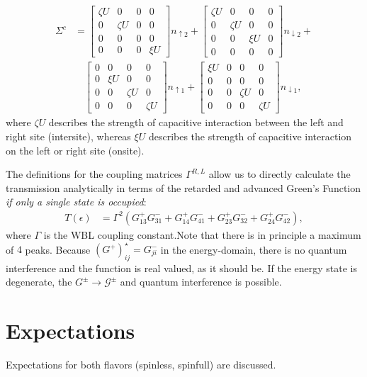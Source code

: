 \begin{align*}
\Sigma^c &= \begin{bmatrix} \zeta U & 0 & 0 & 0\\ 0 & \zeta U & 0 & 0\\ 0 & 0 & 0 & 0\\ 0 & 0 & 0 & \xi U \end{bmatrix} n_{\uparrow 2} + \begin{bmatrix} \zeta U & 0 & 0 & 0\\ 0 & \zeta U & 0 & 0\\ 0 & 0 & \xi U & 0\\ 0 & 0 & 0 & 0 \end{bmatrix} n_{\downarrow 2} +\\
&\quad\begin{bmatrix} 0 & 0 & 0 & 0\\ 0 & \xi  U & 0 & 0\\ 0 & 0 & \zeta U & 0\\ 0 & 0 & 0 & \zeta U \end{bmatrix} n_{\uparrow 1} + \begin{bmatrix} \xi  U & 0 & 0 & 0\\ 0 & 0 & 0 & 0\\ 0 & 0 & \zeta U & 0\\ 0 & 0 & 0 & \zeta U \end{bmatrix} n_{\downarrow 1},
\end{align*}
where $\zeta U$ describes the strength of capacitive interaction between the left and right site (intersite), whereas $\xi U$ describes the strength of capacitive interaction on the left or right site (onsite).

The definitions for the coupling matrices $\Gamma^{R,L}$ allow us to directly calculate the transmission analytically in terms of the retarded and advanced Green's Function \emph{if only a single state is occupied}:
\begin{align*}
T(\epsilon) &= \Gamma^2 \left( G^+_{13} G^-_{31} + G^+_{14} G^-_{41} + G^+_{23} G^-_{32} + G^+_{24} G^-_{42} \right),
\end{align*}
where $\Gamma$ is the WBL coupling constant.Note that there is in principle a maximum of $4$ peaks. Because $\left(G^+\right)_{ij}^\star = G^-_{ji}$ in the energy-domain, there is no quantum interference and the function is real valued, as it should be. If the energy state is degenerate, the $G^\pm \rightarrow \mathscr{G}^\pm$ and quantum interference is possible.

\section{Expectations}
\label{sec:expectations}
Expectations for both flavors (spinless, spinfull) are discussed. 
